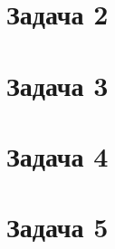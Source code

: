 \documentclass[a4paper]{article}
\begin{document}
\section*{Задача 2}
\section*{Задача 3}
\section*{Задача 4}
\section*{Задача 5}
\end{document}
